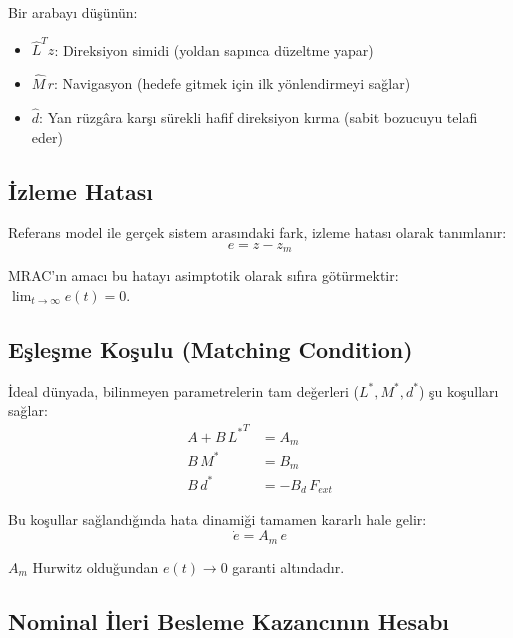 \documentclass[12pt,a4paper]{article}
\begin{document}
\begin{kavram}
Bir arabayı düşünün:
\begin{itemize}
    \item $\hat{L}^T z$: Direksiyon simidi (yoldan sapınca düzeltme yapar)
    \item $\hat{M}\,r$: Navigasyon (hedefe gitmek için ilk yönlendirmeyi sağlar)
    \item $\hat{d}$: Yan rüzgâra karşı sürekli hafif direksiyon kırma (sabit bozucuyu telafi eder)
\end{itemize}
\end{kavram}

\subsection{İzleme Hatası}

Referans model ile gerçek sistem arasındaki fark, izleme hatası olarak tanımlanır:
\begin{equation}
    e = z - z_m
    \label{eq:error}
\end{equation}

MRAC'ın amacı bu hatayı asimptotik olarak sıfıra götürmektir: $\lim_{t\to\infty} e(t) = 0$.

\subsection{Eşleşme Koşulu (Matching Condition)}

İdeal dünyada, bilinmeyen parametrelerin tam değerleri ($L^*, M^*, d^*$) şu koşulları sağlar:
\begin{align}
    A + B\,{L^*}^T &= A_m \label{eq:match_L}\\
    B\,M^* &= B_m \label{eq:match_M}\\
    B\,d^* &= -B_d\,F_{ext} \label{eq:match_d}
\end{align}

Bu koşullar sağlandığında hata dinamiği tamamen kararlı hale gelir:
\begin{equation}
    \dot{e} = A_m\,e
\end{equation}

$A_m$ Hurwitz olduğundan $e(t) \to 0$ garanti altındadır.

\subsection{Nominal İleri Besleme Kazancının Hesabı}
\label{subsec:M_nominal}
\end{document}
